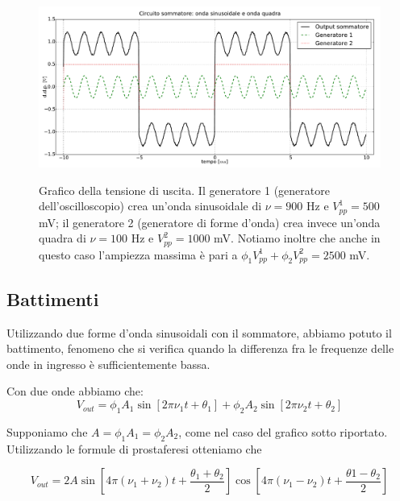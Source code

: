 $$$$

\begin{figure}[ht]
 \centering
   {\includegraphics[width=16.5cm]{../E01/latex/sinquad.pdf}}
 \caption{Grafico della tensione di uscita. Il generatore 1 (generatore dell'oscilloscopio) crea un'onda sinusoidale di $\nu=900$ \si{\hertz} e $V^1_{pp}=500$ \si{\milli\volt}; il generatore 2 (generatore di forme d'onda) crea invece un'onda quadra di $\nu=100$ \si{\hertz} e $V^2_{pp}=1000$ \si{\milli\volt}. Notiamo inoltre che anche in questo caso l'ampiezza massima è pari a $\phi_1 V^1_{pp}+\phi_2 V^2_{pp}=2500$ \si{\milli\volt}.}
 \label{gr:onde2}
\end{figure}

\subsection{Battimenti}

Utilizzando due forme d'onda sinusoidali con il sommatore, abbiamo potuto il battimento, fenomeno che si verifica quando la differenza fra le frequenze delle onde in ingresso è sufficientemente bassa.

Con due onde abbiamo che:
$$V_{out}=\phi_1 A_1 \sin [2 \pi \nu_1 t + \theta_1] + \phi_2 A_2 \sin [2 \pi \nu_2 t + \theta_2]$$

Supponiamo che $A=\phi_1 A_1=\phi_2 A_2$, come nel caso del grafico sotto riportato. Utilizzando le formule di prostaferesi otteniamo che

$$V_{out}=2A \sin \left[4 \pi (\nu_1 + \nu_2) t + \frac{\theta_1+\theta_2}{2}\right] \cos \left[4 \pi (\nu_1 - \nu_2)t + \frac{\theta 1-\theta_2}{2}\right]$$



